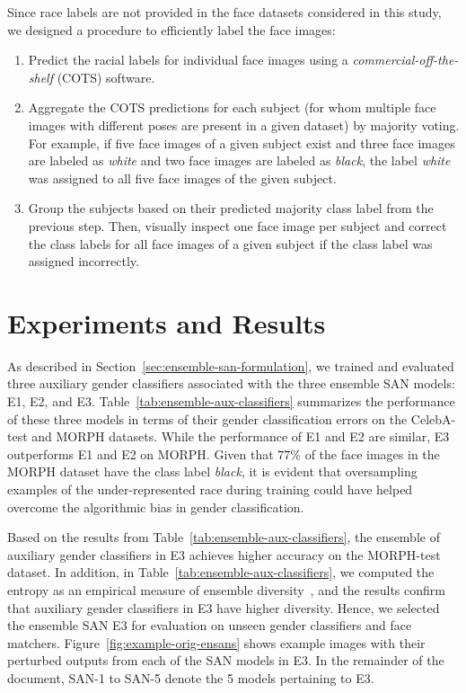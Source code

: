\documentclass[10pt,twocolumn,letterpaper]{article}
\begin{document}
Since race labels are not provided in the face datasets considered in this study, we designed a procedure to efficiently label the face images:
\begin{enumerate}[noitemsep]
\item Predict the racial labels for individual face images using a \textit{commercial-off-the-shelf} (COTS) software.
\item Aggregate the COTS predictions for each subject (for whom multiple face images with different poses are present in a given dataset) by majority voting. For example, if five face images of a given subject exist and three face images are labeled as \textit{white} and two face images are labeled as \textit{black}, the label \textit{white} was assigned to all five face images of the given subject.
\item Group the subjects based on their predicted majority class label from the previous step. Then, visually inspect one face image per subject and correct the class labels for all face images of a given subject if the class label was assigned incorrectly.
\end{enumerate}


\section{Experiments and Results}

As described in Section~\ref{sec:ensemble-san-formulation}, we trained and evaluated three auxiliary gender classifiers associated with the three ensemble SAN models: E1, E2, and E3. 
Table~\ref{tab:ensemble-aux-classifiers} summarizes the performance of these three models in terms of their gender classification errors on the CelebA-test and MORPH datasets. While the performance of E1 and E2 are similar, E3 outperforms E1 and E2 on MORPH. Given that $77\%$ of the face images in the MORPH dataset have the class label {\em black}, it is evident that oversampling examples of the under-represented race during training could have helped overcome the algorithmic bias in gender classification. %


Based on the results from Table~\ref{tab:ensemble-aux-classifiers}, the ensemble of auxiliary gender classifiers in E3 achieves higher accuracy on the MORPH-test dataset. In addition, in Table~\ref{tab:ensemble-aux-classifiers}, we  computed the  entropy as an empirical measure of ensemble diversity~\cite{kuncheva_combining_2004}, and the results confirm that auxiliary gender classifiers in E3 have higher diversity. Hence, we selected the ensemble SAN E3 for evaluation on unseen gender classifiers and face matchers. Figure~\ref{fig:example-orig-ensans} shows example images with their perturbed outputs from each of the SAN models in E3. In the remainder of the document, SAN-1 to SAN-5 denote the 5 models pertaining to E3. 
\end{document}
